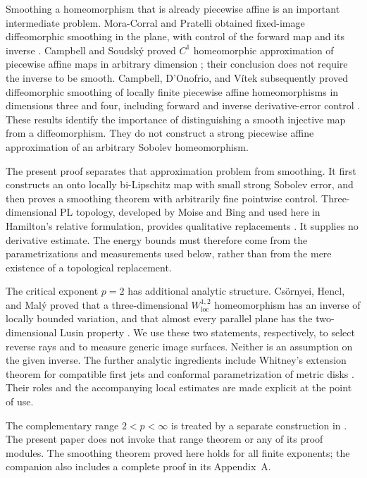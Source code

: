 Smoothing a homeomorphism that is already piecewise affine is an
important intermediate problem. Mora-Corral and Pratelli obtained
fixed-image diffeomorphic smoothing in the plane, with control of the
forward map and its inverse \cite{MoraCorralPratelli2014}.
Campbell and Soudsk\'y proved $C^1$ homeomorphic approximation of
piecewise affine maps in arbitrary dimension
\cite{CampbellSoudsky2021}; their conclusion does not require the
inverse to be smooth. Campbell, D'Onofrio, and V\'itek subsequently
proved diffeomorphic smoothing of locally finite piecewise affine
homeomorphisms in dimensions three and four, including forward and
inverse derivative-error control
\cite[Theorem~A]{CampbellDOnofrioVitek2026}. These results identify
the importance of distinguishing a smooth injective map from a
diffeomorphism. They do not construct a strong piecewise affine
approximation of an arbitrary Sobolev homeomorphism.

The present proof separates that approximation problem from smoothing.
It first constructs an onto locally bi-Lipschitz map with small strong
Sobolev error, and then proves a smoothing theorem with arbitrarily
fine pointwise control. Three-dimensional PL topology, developed by
Moise and Bing and used here in Hamilton's relative formulation,
provides qualitative replacements
\cite{Moise1952Approximation,Moise1952Triangulation,Bing1959,Hamilton1976}.
It supplies no derivative estimate. The energy bounds must therefore
come from the parametrizations and measurements used below, rather
than from the mere existence of a topological replacement.

The critical exponent $p=2$ has additional analytic structure.
Cs\"ornyei, Hencl, and Mal\'y proved that a three-dimensional
$W^{1,2}_{\mathrm{loc}}$ homeomorphism has an inverse of locally
bounded variation, and that almost every parallel plane has the
two-dimensional Lusin property
\cite[Theorems~1.1 and~1.3]{CsornyeiHenclMaly2010}. We use these two
statements, respectively, to select reverse rays and to measure
generic image surfaces. Neither is an assumption on the given inverse.
The further analytic ingredients include Whitney's extension theorem
for compatible first jets \cite{Whitney1934} and conformal
parametrization of metric disks \cite{AhlforsBers1960,McMullen2023}.
Their roles and the accompanying local estimates are made explicit
at the point of use.

The complementary range $2<p<\infty$ is treated by a separate
construction in \cite[Theorem~1.1]{OpenAIHigh2026}. The present paper does
not invoke that range theorem or any of its proof modules. The smoothing
theorem proved here holds for all finite exponents; the companion also
includes a complete proof in its Appendix~A.

